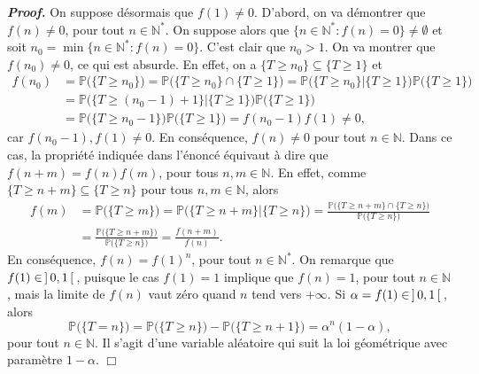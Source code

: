 \documentclass[11pt,a4paper]{article}
\newcommand{\NN}{\mathbb{N}}
\newenvironment{preuve}[1][]
{\vskip 2mm  \noindent\emph{\bf Proof#1. }}{$\Box$ \vskip 2mm}
\let\geq\geqslant
\begin{document}
\begin{preuve}
			On suppose désormais que $f(1) \neq 0$. 
			D'abord, on va démontrer que $f(n) \neq 0$, pour tout $n \in \NN^{*}$. 
			On suppose alors que $\{ n \in \NN^{*} : f(n) = 0 \} \neq \emptyset$ et soit $n_{0} = \min \{ n \in \NN^{*} : f(n) = 0 \}$. 
			C'est clair que $n_{0} > 1$.
			On va montrer que $f(n_{0}) \neq 0$, ce qui est absurde. 
			En effet, on a $\{T \geq n_{0} \} \subseteq  \{T \geq 1\}$ et 
			\begin{align*}
			f(n_{0}) &= \mathbb{P}\big( \{T \geq n_{0} \} \big) = \mathbb{P}\big( \{T \geq n_{0} \} \cap \{T \geq 1\} \big) = \mathbb{P}\big( \{T \geq n_{0} \} | \{T \geq 1\} \big) \mathbb{P}\big( \{T \geq 1\} \big) 
			\\
			&= \mathbb{P}\big( \{T \geq (n_{0}-1)+1 \} | \{T \geq 1\} \big) \mathbb{P}\big( \{T \geq 1\} \big) 
			\\
			&= 
			\mathbb{P}\big( \{T \geq n_{0}-1\} \big) \mathbb{P}\big( \{T \geq 1\} \big) = f(n_{0}-1) f(1)\neq 0,     
			\end{align*}
			car $f(n_{0}-1), f(1) \neq 0$. 
			En conséquence, $f(n) \neq 0$ pour tout $n \in \NN$. 
			Dans ce cas, la propriété indiquée dans l'énoncé équivaut à dire que $f(n+m)= f(n) f(m)$, pour tous $n, m \in \NN$. 
			En effet, comme $\{T \geq n+m \} \subseteq  \{T \geq n\}$ pour tous $n, m \in \NN$, alors 
			\begin{align*}
			f(m) &= \mathbb{P}\big( \{ T\geq m \}\big) = \mathbb{P}\big( \{T \geq n+m \} | \{T \geq n\} \big) = \frac{\mathbb{P}\big( \{T \geq n+m \} \cap \{T \geq n\} \big)}{\mathbb{P}\big( \{T \geq n\} \big)} 
			\\
			&= \frac{\mathbb{P}\big( \{T \geq n+m \} \big)}{\mathbb{P}\big( \{T \geq n\} \big)} = \frac{f(n+m)}{f(n)}.     
			\end{align*}
			En conséquence, $f(n) = f(1)^{n}$, pour tout $n \in \NN^{*}$. 
			On remarque que $f(1) \in  \hskip 0.6mm]\hskip 0.6mm 0,1\hskip 0.6mm[\hskip 0.6mm$, puisque le cas $f(1)=1$ implique que $f(n) = 1$, pour tout $n \in \NN$, mais la limite de $f(n)$ vaut zéro quand $n$ tend vers $+ \infty$.  
			Si $\alpha = f(1) \in \hskip 0.6mm]\hskip 0.6mm 0, 1\hskip 0.6mm[\hskip 0.6mm$, alors
			\[     \mathbb{P}\big( \{ T = n \}\big) = \mathbb{P}\big( \{ T\geq n \}\big) - \mathbb{P}\big( \{ T\geq n+1 \}\big) = \alpha^{n} (1- \alpha),     \]
			pour tout $n \in \NN$. 
			Il s'agit d'une variable aléatoire qui suit la loi géométrique avec paramètre $1 - \alpha$. 
		\end{preuve}
		
\end{document}
